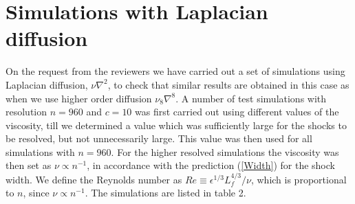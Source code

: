 \appendix

\section{Simulations with Laplacian diffusion}
On the request from the reviewers we have carried out a set of simulations using Laplacian diffusion, $ \nu \nabla^{2} $, to check that similar results are obtained in this case as when we use higher order diffusion $ \nu_8 \nabla^{8} $. 
A number of test simulations with resolution $ n = 960 $ and $ c= 10 $ was first carried out using different values of the viscosity, till we determined a value which was sufficiently large for the shocks to be resolved, but not unnecessarily large. 
This value was then used for all simulations with $ n = 960 $. For the higher resolved simulations the viscosity was then set as $ \nu \propto n^{-1} $, in accordance with the prediction  (\ref{Width}) for the shock width.
We define the Reynolds number as $ Re \equiv \epsilon^{1/3} L_f^{4/3}/\nu $, which is proportional to $ n $, since $ \nu \propto n^{-1} $.
The simulations are listed in table 2.  







